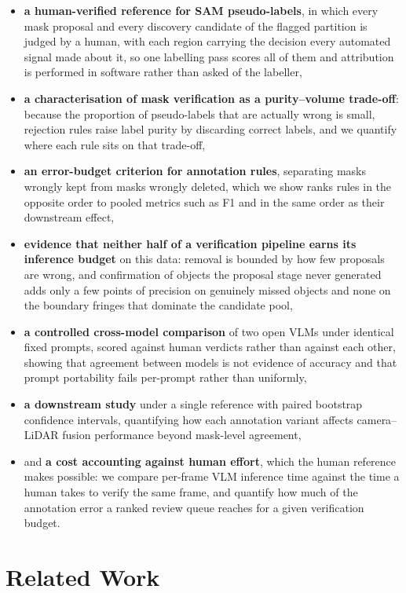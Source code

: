 \documentclass[conference]{IEEEtran}
\begin{document}
\begin{itemize}
    \item \textbf{a human-verified reference for SAM pseudo-labels}, in which every mask proposal and every discovery candidate of the flagged partition is judged by a human, with each region carrying the decision every automated signal made about it, so one labelling pass scores all of them and attribution is performed in software rather than asked of the labeller,
    \item \textbf{a characterisation of mask verification as a purity--volume trade-off}: because the proportion of pseudo-labels that are actually wrong is small, rejection rules raise label purity by discarding correct labels, and we quantify where each rule sits on that trade-off,
    \item \textbf{an error-budget criterion for annotation rules}, separating masks wrongly kept from masks wrongly deleted, which we show ranks rules in the opposite order to pooled metrics such as F1 and in the same order as their downstream effect,
    \item \textbf{evidence that neither half of a verification pipeline earns its inference budget} on this data: removal is bounded by how few proposals are wrong, and confirmation of objects the proposal stage never generated adds only a few points of precision on genuinely missed objects and none on the boundary fringes that dominate the candidate pool,
    \item \textbf{a controlled cross-model comparison} of two open VLMs under identical fixed prompts, scored against human verdicts rather than against each other, showing that agreement between models is not evidence of accuracy and that prompt portability fails per-prompt rather than uniformly,
    \item \textbf{a downstream study} under a single reference with paired bootstrap confidence intervals, quantifying how each annotation variant affects camera–LiDAR fusion performance beyond mask-level agreement,
    \item and \textbf{a cost accounting against human effort}, which the human reference makes possible: we compare per-frame VLM inference time against the time a human takes to verify the same frame, and quantify how much of the annotation error a ranked review queue reaches for a given verification budget.
\end{itemize}

\section{Related Work}
\label{sec:related_work}
\end{document}
